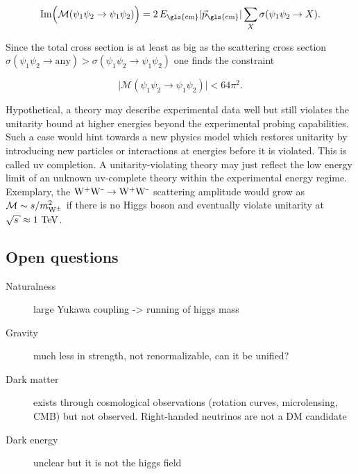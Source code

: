 \begin{equation}
\mathrm{Im}\Big(\mathcal{M}(\psi_{1}\psi_{2}\to\psi_{1}\psi_{2})\Big)=2\,E_\mathrm{\gls{cm}}|\vec{p}_\mathrm{\gls{cm}}|\sum_{X}\sigma(\psi_{1}\psi_{2}\to X).
\end{equation}

Since the total cross section is at least as big as the scattering cross section $\sigma(\psi_{1}\psi_{2}\to \mathrm{any})>\sigma(\psi_{1}\psi_{2}\to \psi_{1}\psi_{2})$ one finds the constraint

\begin{equation}
\Big|\mathcal{M}(\psi_{1}\psi_{2}\to\psi_{1}\psi_{2})\Big|<64\pi^2.
\end{equation}

Hypothetical, a theory may describe experimental data well but still violates the unitarity bound at higher energies beyond the experimental probing capabilities. Such a case would hint towards a new physics model which restores unitarity by introducing new particles or interactions at energies before it is violated. This is called \gls{uv} completion. A unitarity-violating theory may just reflect the low energy limit of an unknown \gls{uv}-complete theory within the experimental energy regime. Exemplary,  the $\mathrm{W}^{\rmplus}\mathrm{W}^{\rmminus}\to\mathrm{W}^{\rmplus}\mathrm{W}^{\rmminus}$ scattering amplitude would grow as $\mathcal{M}\sim s/m_{\mathrm{W}^{\pm}}^2$ if there is no Higgs boson and eventually violate unitarity at $\sqrt{s}\approx1~\TeV$.


\subsection{Open questions}

\begin{description}
\item[Naturalness] large Yukawa coupling -> running of higgs mass
\item[Gravity] much less in strength, not renormalizable, can it be unified?
\item[Dark matter] exists through cosmological observations (rotation curves, microlensing, CMB) but not observed. Right-handed neutrinos are not a DM candidate
\item[Dark energy] unclear but it is not the higgs field
\end{description}


